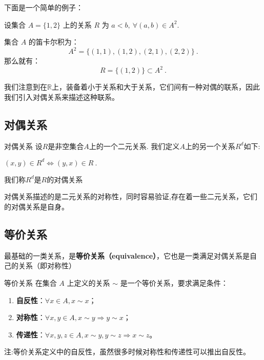 下面是一个简单的例子：

\begin{example}{}
设集合 $A=\{1,2\}$ 上的关系 $R$ 为 $a<b,\ \forall (a,b)\in A^2$.

集合 $A$ 的笛卡尔积为：
\begin{equation}
A^2 = \{(1,1),(1,2),(2,1),(2,2)\}~.
\end{equation}
那么就有：
\begin{equation}
R=\{(1,2)\}\subset A^2~.
\end{equation}

\end{example}

我们注意到在$\mathbb{R}$上，装备着小于关系和大于关系，它们间有一种对偶的联系，因此我们引入对偶关系来描述这种联系。

\subsection{对偶关系}
\begin{definition}{对偶关系}
设$R$是非空集合$A$上的一个二元关系. 我们定义$A$上的另一个关系$R^{d}$如下:

$(x, y) \in R^{d} \Leftrightarrow(y, x) \in R~.$

我们称$R^{d}$是$R$的对偶关系

\end{definition}
对偶关系描述的是二元关系的对称性，同时容易验证,存在着一些二元关系，它们的对偶关系是自身。

\subsection{等价关系}\label{sub_Relat_1}
最基础的一类关系，是\textbf{等价关系（equivalence）}，它也是一类满足对偶关系是自己的关系（即对称性） 
\begin{definition}{等价关系}\label{def_Relat_1}
在集合 $A$ 上定义的关系 $\sim$ 是一个等价关系，要求满足条件：
\begin{enumerate}
\item \textbf{自反性}：$\forall x\in A, x\sim x$；
\item \textbf{对称性}：$\forall x, y\in A, x\sim y \Rightarrow y\sim x$；
\item \textbf{传递性}：$\forall x, y, z\in A, x\sim y, y\sim z\Rightarrow x\sim z$。
\end{enumerate}
\end{definition}

注:等价关系定义中的自反性，虽然很多时候对称性和传递性可以推出自反性。



